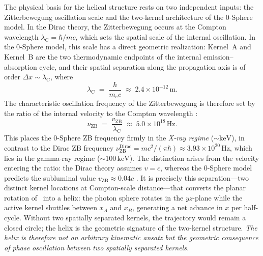 \documentclass[%
 reprint, amsmath,amssymb, aps, prb, ]{revtex4-2}
\numberwithin{equation}{section}
\newcommand{\lambdaC}{\lambda_{\mathrm{C}}}
\begin{document}
The physical basis for the helical structure rests on two independent inputs: the Zitterbewegung oscillation scale and the two-kernel architecture of the 0-Sphere model. In the Dirac theory, the Zitterbewegung occurs at the Compton wavelength $\lambdaC = \hbar/mc$, which sets the spatial scale of the internal oscillation. In the 0-Sphere model, this scale has a direct geometric realization: Kernel~A and Kernel~B are the two thermodynamic endpoints of the internal emission--absorption cycle, and their spatial separation along the propagation axis is of order $\Delta x \sim \lambdaC$, where
\begin{equation}
\lambdaC \;=\; \frac{\hbar}{m_e c} \;\approx\; 2.4 \times 10^{-12}\,\mathrm{m}.
\label{eq:compton}
\end{equation}
The characteristic oscillation frequency of the Zitterbewegung is therefore set by the ratio of the internal velocity to the Compton wavelength \cite{hanamura36}:
\begin{equation}
\nu_{\mathrm{ZB}} \;=\; \frac{v_{\mathrm{ZB}}}{\lambdaC} \;\approx\; 5.0 \times 10^{18}\,\mathrm{Hz}.
\label{eq:nu_zb}
\end{equation}
This places the 0-Sphere ZB frequency firmly in the \emph{X-ray regime} ($\sim\mathrm{keV}$), in contrast to the Dirac ZB frequency $\nu_{\mathrm{ZB}}^{\mathrm{Dirac}} = mc^2/(\pi\hbar) \approx 3.93\times10^{20}\,\mathrm{Hz}$, which lies in the gamma-ray regime ($\sim100\,\mathrm{keV}$). The distinction arises from the velocity entering the ratio: the Dirac theory assumes $v = c$, whereas the 0-Sphere model predicts the subluminal value $v_\mathrm{ZB} \approx 0.04c$ \cite{hanamura10, hanamura36}. It is precisely this separation---two distinct kernel locations at Compton-scale distance---that converts the planar rotation of~\cite{hanamura50} into a helix: the photon sphere rotates in the $yz$-plane while the active kernel shuttles between $x_A$ and $x_B$, generating a net advance in $x$ per half-cycle. Without two spatially separated kernels, the trajectory would remain a closed circle; the helix is the geometric signature of the two-kernel structure. \emph{The helix is therefore not an arbitrary kinematic ansatz but the geometric consequence of phase oscillation between two spatially separated kernels.}
\end{document}
